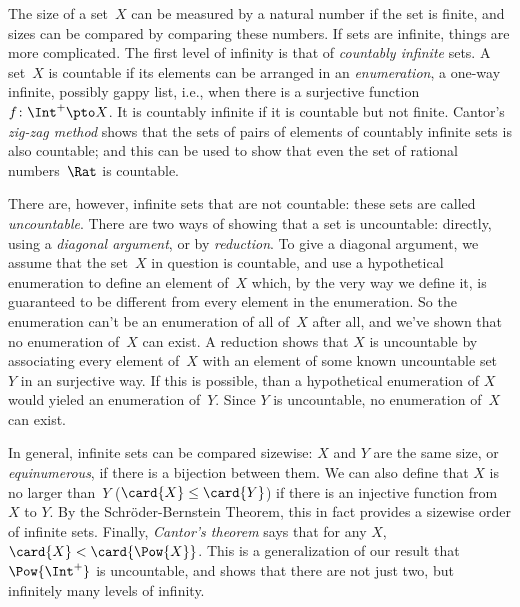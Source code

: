 The size of a set~$X$ can be measured by a natural number if the set
is finite, and sizes can be compared by comparing these numbers. If sets
are infinite, things are more complicated. The first level of
infinity is that of \emph{countably infinite} sets. A set~$X$ is
countable if its elements can be arranged in an \emph{enumeration}, a
one-way infinite, possibly gappy list, i.e., when there is a
surjective function~$f\colon \Int^+ \pto X$. It is countably infinite
if it is countable but not finite. Cantor's \emph{zig-zag method}
shows that the sets of pairs of elements of countably infinite sets is
also countable; and this can be used to show that even the set of
rational numbers~$\Rat$ is countable.

There are, however, infinite sets that are not countable: these sets
are called \emph{uncountable}. There are two ways of showing that a
set is uncountable: directly, using a \emph{diagonal argument}, or by
\emph{reduction}. To give a diagonal argument, we assume that the
set~$X$ in question is countable, and use a hypothetical enumeration
to define an element of~$X$ which, by the very way we define it, is
guaranteed to be different from every element in the enumeration. So
the enumeration can't be an enumeration of all of~$X$ after all, and
we've shown that no enumeration of~$X$ can exist. A reduction shows
that $X$ is uncountable by associating every element of~$X$ with an
element of some known uncountable set~$Y$ in an surjective way. If
this is possible, than a hypothetical enumeration of $X$ would yieled
an enumeration of~$Y$. Since $Y$ is uncountable, no enumeration of~$X$
can exist.

In general, infinite sets can be compared sizewise: $X$ and $Y$ are
the same size, or \emph{equinumerous}, if there is a bijection between
them. We can also define that $X$ is no larger than~$Y$ ($\card{X} \le
\card{Y}$) if there is an injective function from $X$ to
$Y$. By the Schr\"oder-Bernstein Theorem, this in fact provides a
sizewise order of infinite sets. Finally, \emph{Cantor's theorem}
says that for any $X$, $\card{X} < \card{\Pow{X}}$. This is a
generalization of our result that $\Pow{\Int^+}$ is uncountable, and
shows that there are not just two, but infinitely many levels of
infinity.
